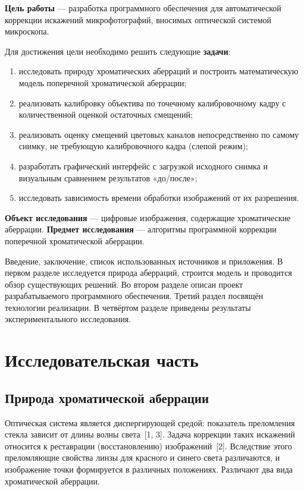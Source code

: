 \documentclass[a4paper,14pt,oneside]{extreport}
\begin{document}
\textbf{Цель работы} — разработка программного обеспечения для
автоматической коррекции искажений микрофотографий, вносимых оптической
системой микроскопа.

Для достижения цели необходимо решить следующие \textbf{задачи}:
\begin{enumerate}
\item исследовать природу хроматических аберраций и построить
математическую модель поперечной хроматической аберрации;
\item реализовать калибровку объектива по точечному калибровочному кадру
с количественной оценкой остаточных смещений;
\item реализовать оценку смещений цветовых каналов непосредственно по
самому снимку, не требующую калибровочного кадра (слепой режим);
\item разработать графический интерфейс с загрузкой исходного снимка и
визуальным сравнением результатов «до/после»;
\item исследовать зависимость времени обработки изображений от их
разрешения.
\end{enumerate}

\textbf{Объект исследования} — цифровые изображения, содержащие
хроматические аберрации. \textbf{Предмет исследования} — алгоритмы
программной коррекции поперечной хроматической аберрации.

Введение, заключение, список использованных источников и приложения. В
первом разделе исследуется природа аберраций, строится модель и проводится
обзор существующих решений. Во втором разделе описан проект
разрабатываемого программного обеспечения. Третий раздел посвящён
технологии реализации. В четвёртом разделе приведены результаты
экспериментального исследования.

\clearpage
\section{Исследовательская часть}

\subsection{Природа хроматической аберрации}

Оптическая система является диспергирующей средой: показатель преломления
стекла зависит от длины волны света~[1, 3]. Задача коррекции таких
искажений относится к реставрации (восстановлению) изображений~[2].
Вследствие этого преломляющие свойства линзы для красного и синего света различаются, и изображение
точки формируется в различных положениях. Различают два вида
хроматической аберрации.
\end{document}
